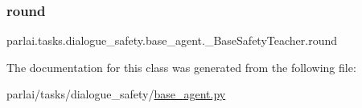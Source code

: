 \subsubsection{\texorpdfstring{round}{round}}
{\footnotesize\ttfamily parlai.\+tasks.\+dialogue\+\_\+safety.\+base\+\_\+agent.\+\_\+\+Base\+Safety\+Teacher.\+round}



The documentation for this class was generated from the following file\+:\begin{DoxyCompactItemize}
\item 
parlai/tasks/dialogue\+\_\+safety/\hyperlink{base__agent_8py}{base\+\_\+agent.\+py}\end{DoxyCompactItemize}
